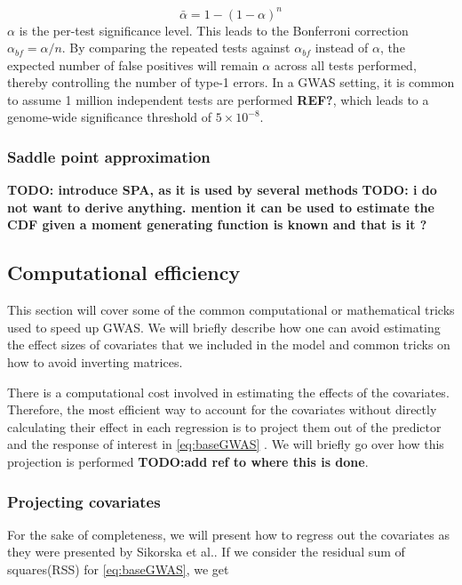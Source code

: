 \begin{equation} \label{eq:bonferroni}
\bar{\alpha} = 1 - (1-\alpha)^n 
\end{equation}
$ \alpha$ is the per-test significance level. This leads to the Bonferroni correction $ \alpha_{bf} =  \alpha/n $. By comparing the repeated tests against $ \alpha_{bf} $ instead of $ \alpha $, the expected number of false positives will remain $ \alpha $ across all tests performed, thereby controlling the number of type-1 errors. In a GWAS setting, it is common to assume 1 million independent tests are performed \textbf{REF?}, which leads to a genome-wide significance threshold of $ 5 \times 10^{-8} $.



\subsubsection{Saddle point approximation}
\textbf{TODO: introduce SPA, as it is used by several methods}
\textbf{TODO: i do not want to derive anything. mention it can be used to estimate the CDF given a moment generating function is known and that is it ?}



\subsection{Computational efficiency}
This section will cover some of the common computational or mathematical tricks used to speed up GWAS. We will briefly describe how one can avoid estimating the effect sizes of covariates that we included in the model and common tricks on how to avoid inverting matrices. 

There is a computational cost involved in estimating the effects of the covariates. Therefore, the most efficient way to account for the covariates without directly calculating their effect in each regression is to project them out of the predictor and the response of interest in \cref{eq:baseGWAS} \cite{sikorska2013gwas}. We will briefly go over how this projection is performed \textbf{TODO:add ref to where this is done}.

\subsubsection{Projecting covariates}
For the sake of completeness, we will present how to regress out the covariates as they were presented by Sikorska et al.\cite{sikorska2013gwas}. If we consider the residual sum of squares(RSS) for \cref{eq:baseGWAS}, we get 

